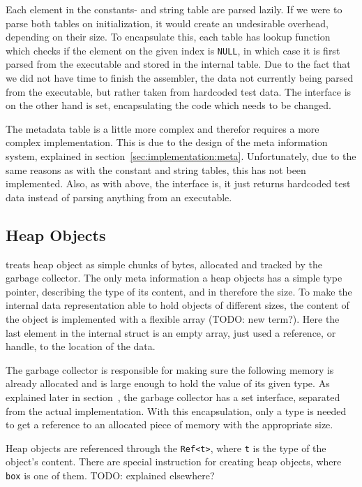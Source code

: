Each element in the constants- and string table are parsed lazily. If we were to
parse both tables on initialization, it would create an undesirable overhead,
depending on their size. To encapsulate this, each table has lookup function
which checks if the element on the given index is {\tt NULL}, in which case it
is first parsed from the executable and stored in the internal table. Due to the
fact that we did not have time to finish the assembler, the data not currently
being parsed from the executable, but rather taken from hardcoded test data. The
interface is on the other hand is set, encapsulating the code which needs to be
changed.

The metadata table is a little more complex and therefor requires a more complex
implementation. This is due to the design of the meta information system,
explained in section~\ref{sec:implementation:meta}. Unfortunately, due to the
same reasons as with the constant and string tables, this has not been
implemented. Also, as with above, the interface is, it just returns hardcoded
test data instead of parsing anything from an executable.


\subsection{Heap Objects}

\thename{} treats heap object as simple chunks of bytes, allocated and tracked
by the garbage collector. The only meta information a heap objects has a simple
type pointer, describing the type of its content, and in therefore the size. To
make the internal data representation able to hold objects of different sizes,
the content of the object is implemented with a flexible array (TODO: new
term?). Here the last element in the internal struct is an empty array, just
used a reference, or handle, to the location of the data.

The garbage collector is responsible for making sure the following memory is
already allocated and is large enough to hold the value of its given type. As
explained later in section~\cite{sec:separate-components:gc}, the garbage
collector has a set interface, separated from the actual implementation. With
this encapsulation, only a type is needed to get a reference to an allocated
piece of memory with the appropriate size.

Heap objects are referenced through the {\tt Ref<t>}, where {\tt t} is the type
of the object's content. There are special instruction for creating heap
objects, where {\tt box} is one of them. TODO: explained elsewhere?


